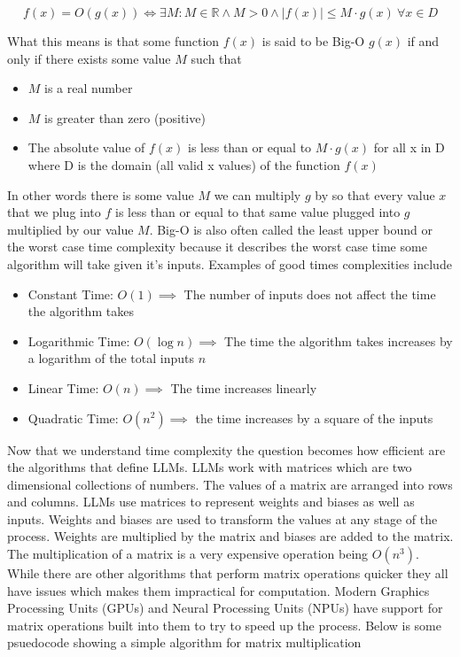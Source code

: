 \documentclass{article}[12pt]
\begin{document}
\[f(x) = O(g(x)) \iff \exists M : M \in \mathbb{R} \land M > 0 \land |f(x)| \le M \cdot g(x) ~ \forall x \in D\]

What this means is that some function $f(x)$ is said to be Big-O $g(x)$ if and only if there exists some value $M$ such that 
\begin{itemize}
\item $M$ is a real number
\item $M$ is greater than zero (positive)
\item The absolute value of $f(x)$ is less than or equal to $M \cdot g(x)$ for all x in D where D is the domain (all valid x values) of the function $f(x)$ 
\end{itemize}

In other words there is some value $M$ we can multiply $g$ by so that every value $x$ that we plug into $f$ is less than or equal to that same value plugged into $g$ multiplied by our value $M$. Big-O is also often called the least upper bound or the worst case time complexity because it describes the worst case time some algorithm will take given it's inputs. Examples of good times complexities include

\begin{itemize}
\item Constant Time: $O(1) \implies$ The number of inputs does not affect the time the algorithm takes
\item Logarithmic Time: $O(\log{n}) \implies$ The time the algorithm takes increases by a logarithm of the total inputs $n$
\item Linear Time: $O(n) \implies$ The time increases linearly
\item Quadratic Time: $O(n^{2}) \implies$ the time increases by a square of the inputs
\end{itemize}

Now that we understand time complexity the question becomes how efficient are the algorithms that define LLMs. LLMs work with matrices which are two dimensional collections of numbers. The values of a matrix are arranged into rows and columns. LLMs use matrices to represent weights and biases as well as inputs. Weights and biases are used to transform the values at any stage of the process. Weights are multiplied by the matrix and biases are added to the matrix. The multiplication of a matrix is a very expensive operation being $O(n^{3})$. While there are other algorithms that perform matrix operations quicker they all have issues which makes them impractical for computation. Modern Graphics Processing Units (GPUs) and Neural Processing Units (NPUs) have support for matrix operations built into them to try to speed up the process. Below is some psuedocode showing a simple algorithm for matrix multiplication
\end{document}
